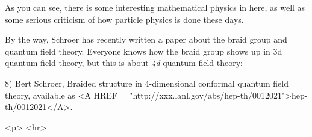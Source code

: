 As you can see, there is some interesting mathematical physics in here, 
as well as some serious criticism of how particle physics is done these 
days.  

By the way, Schroer has recently written a paper about the braid group 
and quantum field theory.  Everyone knows how the braid group shows
up in 3d quantum field theory, but this is about \emph{4d} 
quantum field theory:

8) Bert Schroer, Braided structure in 4-dimensional conformal quantum
field theory, available as <A HREF =
"http://xxx.lanl.gov/abs/hep-th/0012021">hep-th/0012021</A>.

<p> <hr>



